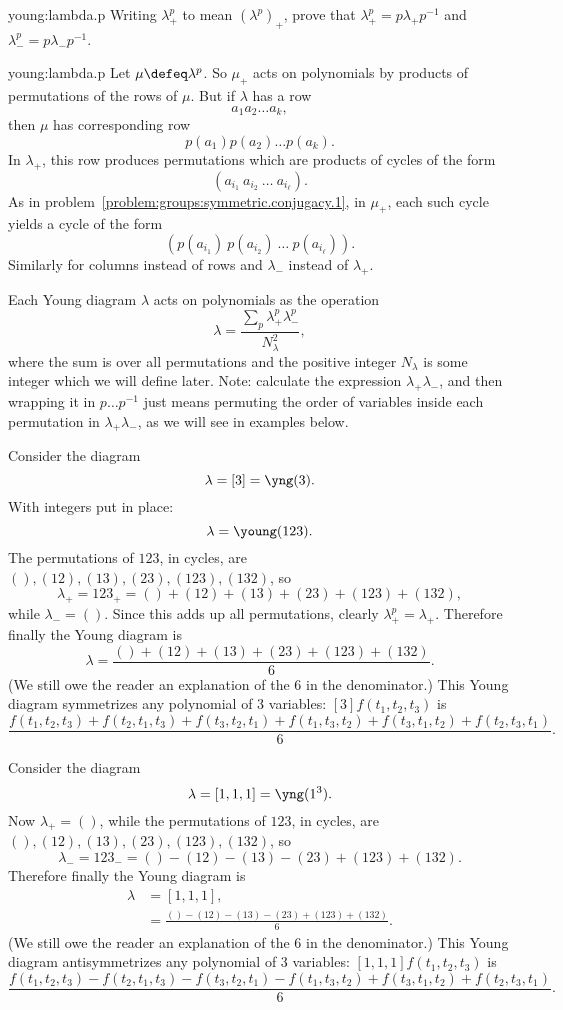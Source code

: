 \begin{problem}{young:lambda.p}
Writing \(\lambda^p_+\) to mean \((\lambda^p)_+\), prove that \(\lambda^p_+=p\lambda_+p^{-1}\) and \(\lambda^p_-=p\lambda_-p^{-1}\).
\end{problem}
\begin{answer}{young:lambda.p}
Let \(\mu\defeq\lambda^p\).
So \(\mu_+\) acts on polynomials by products of permutations of the rows of \(\mu\).
But if \(\lambda\) has a row 
\[
a_1 a_2 \dots a_k,
\]
then \(\mu\) has corresponding row 
\[
p(a_1) p(a_2) \dots p(a_k).
\]
In \(\lambda_+\), this row produces permutations which are products of cycles of the form 
\[
(a_{i_1} \ a_{i_2} \ \dots \ a_{i_{\ell}}).
\]
As in problem~\vref{problem:groups:symmetric.conjugacy.1}, in \(\mu_+\), each such cycle yields a cycle of the form 
\[
(p(a_{i_1}) \ p(a_{i_2}) \ \dots \ p(a_{i_{\ell}})).
\]
Similarly for columns instead of rows and \(\lambda_-\) instead of \(\lambda_+\).
\end{answer}

Each Young diagram \(\lambda\) acts on polynomials as the operation
\[
\lambda = \frac{\sum_p \lambda^p_+ \lambda^p_-}{N^2_{\lambda}},
\]
where the sum is over all permutations and the positive integer \(N_{\lambda}\) is some integer which we will define later.
Note: calculate the expression \(\lambda_+ \lambda_-\), and then wrapping it in \(p \dots p^{-1}\) just means permuting the order of variables inside each permutation in \(\lambda_+ \lambda_-\), as we will see in examples below.
\begin{example}
Consider the diagram
\[
\lambda=[3]=\yng(3).
\]
With integers put in place:
\[
\lambda=\young(123).
\]
The permutations of \(123\), in cycles, are \((), (12), (13), (23), (123), (132)\), so
\[
\lambda_+=123_+ = ()+(12)+(13)+(23)+(123)+(132), 
\]
while \(\lambda_-=()\).
Since this adds up all permutations, clearly \(\lambda_+^p=\lambda_+\).
Therefore finally the Young diagram is
\[
\lambda=\frac{()+(12)+(13)+(23)+(123)+(132)}{6}.
\]
(We still owe the reader an explanation of the 6 in the denominator.)
This Young diagram symmetrizes any polynomial of 3 variables: \([3]f(t_1,t_2,t_3)\) is
\[
\frac{f(t_1,t_2,t_3)+f(t_2,t_1,t_3)+f(t_3,t_2,t_1)+f(t_1,t_3,t_2)+f(t_3,t_1,t_2)+f(t_2,t_3,t_1)}{6}.
\]
\end{example}

\begin{example}
Consider the diagram
\[
\lambda=[1,1,1]=\yng(1^3).
\]
Now \(\lambda_+=()\), while the permutations of \(123\), in cycles, are \((), (12), (13), (23), (123), (132)\), so 
\[
\lambda_-=123_- = ()-(12)-(13)-(23)+(123)+(132).
\]
Therefore finally the Young diagram is
\begin{align*}
\lambda&=
[1,1,1],
\\
&=
\frac{()-(12)-(13)-(23)+(123)+(132)}{6}.
\end{align*}
(We still owe the reader an explanation of the 6 in the denominator.)
This Young diagram antisymmetrizes any polynomial of 3 variables: \([1,1,1]f(t_1,t_2,t_3)\) is
\[
\frac{f(t_1,t_2,t_3)-f(t_2,t_1,t_3)-f(t_3,t_2,t_1)-f(t_1,t_3,t_2)+f(t_3,t_1,t_2)+f(t_2,t_3,t_1)}{6}.
\]
\end{example}

